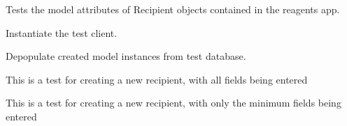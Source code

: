 \documentclass[letterpaper,10pt,english]{sphinxmanual}
\begin{document}

\begin{fulllineitems}
\label{api:experimentdb.sharing.tests.RecipientModelTests}
Tests the model attributes of Recipient objects contained in the reagents app.

\begin{fulllineitems}
\label{api:experimentdb.sharing.tests.RecipientModelTests.setUp}
Instantiate the test client.

\end{fulllineitems}


\begin{fulllineitems}
\label{api:experimentdb.sharing.tests.RecipientModelTests.tearDown}
Depopulate created model instances from test database.

\end{fulllineitems}


\begin{fulllineitems}
\label{api:experimentdb.sharing.tests.RecipientModelTests.test_create_recipient_all_fields}
This is a test for creating a new recipient, with all fields being entered

\end{fulllineitems}


\begin{fulllineitems}
\label{api:experimentdb.sharing.tests.RecipientModelTests.test_create_recipient_minimal}
This is a test for creating a new recipient, with only the minimum fields being entered

\end{fulllineitems}


\end{fulllineitems}
\end{document}
